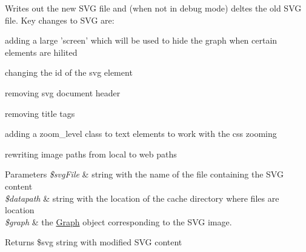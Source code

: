 Writes out the new SVG file and (when not in debug mode) deltes the old SVG file. Key changes to SVG are:
\begin{DoxyItemize}
\item adding a large 'screen' which will be used to hide the graph when certain elements are hilited
\item changing the id of the svg element
\item removing svg document header
\item removing title tags
\item adding a zoom\_\-level class to text elements to work with the css zooming
\item rewriting image paths from local to web paths 
\begin{DoxyParams}{Parameters}
{\em \$svgFile} & string with the name of the file containing the SVG content \\
\hline
{\em \$datapath} & string with the location of the cache directory where files are location \\
\hline
{\em \$graph} & the \hyperlink{classGraph}{Graph} object corresponding to the SVG image. \\
\hline
\end{DoxyParams}
\begin{DoxyReturn}{Returns}
\$svg string with modified SVG content 
\end{DoxyReturn}

\end{DoxyItemize}

